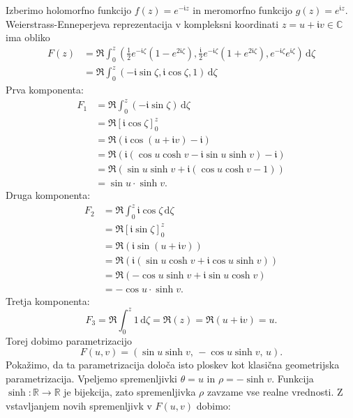 \documentclass[fin1, tisk, bibtex]{fmfdelo}
\begin{document}
Izberimo holomorfno funkcijo $f(z)=e^{-\mathfrak{i} z}$ in meromorfno funkcijo $g(z)=e^{\mathfrak{i} z}$. Weierstrass-Enneperjeva reprezentacija v kompleksni koordinati $z=u+\mathfrak{i} v \in \mathbb{C}$ ima obliko
\begin{align*}
    F(z)&=\Re \int_0^z\left(\frac{1}{2} e^{-\mathfrak{i} \zeta}\left(1-e^{2 \mathfrak{i} \zeta}\right), \frac{\mathfrak{i}}{2} e^{-\mathfrak{i} \zeta}\left(1+e^{2 \mathfrak{i} \zeta}\right), e^{-\mathfrak{i} \zeta} e^{\mathfrak{i} \zeta} \right) \, \mathrm{d} \zeta \\   
    &=\Re \int_0^z(-\mathfrak{i} \sin \zeta, \mathfrak{i} \cos \zeta, 1) \, \mathrm{d} \zeta    
\end{align*}
Prva komponenta:
\begin{align*}
    F_1 & =\Re \int_0^z(-\mathfrak{i} \sin \zeta) \, \mathrm{d} \zeta \\
    & =\Re[\mathfrak{i} \cos \zeta]_0^z \\
    & =\Re(\mathfrak{i} \cos (u+\mathfrak{i} v)-\mathfrak{i}) \\
    & =\Re(\mathfrak{i}(\cos u \cosh v-\mathfrak{i} \sin u \sinh v)-\mathfrak{i}) \\
    & =\Re(\sin u \sinh v+\mathfrak{i}(\cos u \cosh v-1)) \\
    & =\sin u \cdot \sinh v .
\end{align*}
Druga komponenta:
\begin{align*}
    F_2 & =\Re \int_0^z \mathfrak{i} \cos \zeta \, \mathrm{d} \zeta \\
    & =\Re[\mathfrak{i} \sin \zeta]_0^z \\
    & =\Re(\mathfrak{i} \sin (u+\mathfrak{i} v)) \\
    & =\Re(\mathfrak{i}(\sin u \cosh v+\mathfrak{i} \cos u \sinh v)) \\
    & =\Re(-\cos u \sinh v+\mathfrak{i} \sin u \cosh v) \\
    & =-\cos u \cdot \sinh v .
\end{align*}
Tretja komponenta:
\begin{equation*}
    F_3=\Re \int_0^z 1 \, \mathrm{d} \zeta=\Re(z)=\Re(u+\mathfrak{i} v)=u.
\end{equation*}
Torej dobimo parametrizacijo 
\begin{equation*}
    F(u,v) = (\sin u \sinh v, \, -\cos u \sinh v, \, u).
\end{equation*}
Pokažimo, da ta parametrizacija določa isto ploskev kot klasična geometrijska parametrizacija. Vpeljemo spremenljivki $\theta = u$ in $\rho = -\sinh v$. Funkcija $\sinh: \mathbb{R} \rightarrow \mathbb{R}$ je bijekcija, zato spremenljivka $\rho$ zavzame vse realne vrednosti. Z vstavljanjem novih spremenljivk v $F(u,v)$ dobimo:
\end{document}
